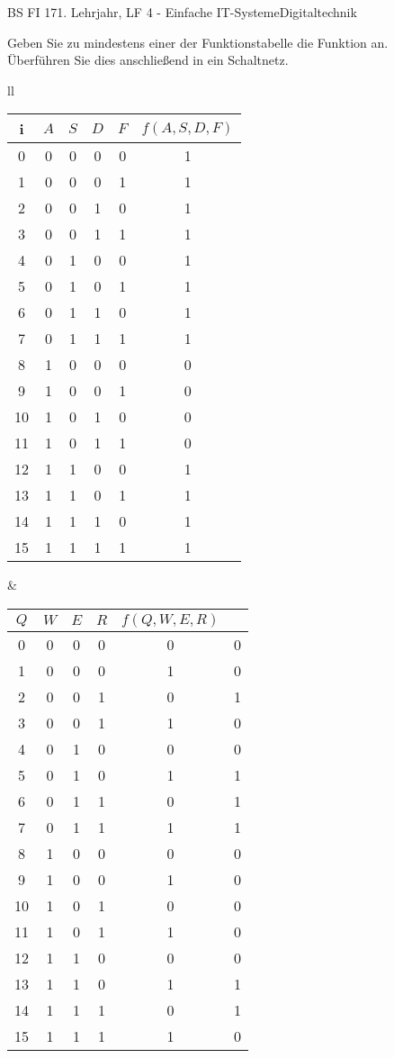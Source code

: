 \documentclass[oneside,openany,headings=optiontotoc,11pt,numbers=noenddot]{scrreprt}
\begin{document}
	\begin{worksheet}{BS FI 17}{1. Lehrjahr, LF 4 - Einfache IT-Systeme}{Digitaltechnik}
		\begin{framed}
			\noindent
			Geben Sie zu mindestens einer der Funktionstabelle die Funktion an.\\
			Überführen Sie dies anschließend in ein Schaltnetz.\\
			\par\noindent
			\begin{tabular}{ll}
				\begin{tabularx}{0.45\textwidth}{c|c|c|c|c|c}
					i & \(A\) & \(S\) & \(D\) & \(F\) & \(f(A, S, D, F)\)\\
					\hline
					0 & 0 & 0 & 0 & 0 & 1\\
					1 & 0 & 0 & 0 & 1 & 1\\
					2 & 0 & 0 & 1 & 0 & 1\\
					3 & 0 & 0 & 1 & 1 & 1\\
					4 & 0 & 1 & 0 & 0 & 1\\
					5 & 0 & 1 & 0 & 1 & 1\\
					6 & 0 & 1 & 1 & 0 & 1\\
					7 & 0 & 1 & 1 & 1 & 1\\
					8 & 1 & 0 & 0 & 0 & 0\\
					9 & 1 & 0 & 0 & 1 & 0\\
					10 & 1 & 0 & 1 & 0 & 0\\
					11 & 1 & 0 & 1 & 1 & 0\\
					12 & 1 & 1 & 0 & 0 & 1\\
					13 & 1 & 1 & 0 & 1 & 1\\
					14 & 1 & 1 & 1 & 0 & 1\\
					15 & 1 & 1 & 1 & 1 & 1
				\end{tabularx} &
				\begin{tabularx}{0.45\textwidth}{c|c|c|c|c|c}
					\(Q\) & \(W\) & \(E\) & \(R\) & \(f(Q, W, E, R)\)\\
					\hline
					0 & 0 & 0 & 0 & 0 & 0\\
					1 & 0 & 0 & 0 & 1 & 0\\
					2 & 0 & 0 & 1 & 0 & 1\\
					3 & 0 & 0 & 1 & 1 & 0\\
					4 & 0 & 1 & 0 & 0 & 0\\
					5 & 0 & 1 & 0 & 1 & 1\\
					6 & 0 & 1 & 1 & 0 & 1\\
					7 & 0 & 1 & 1 & 1 & 1\\
					8 & 1 & 0 & 0 & 0 & 0\\
					9 & 1 & 0 & 0 & 1 & 0\\
					10 & 1 & 0 & 1 & 0 & 0\\
					11 & 1 & 0 & 1 & 1 & 0\\
					12 & 1 & 1 & 0 & 0 & 0\\
					13 & 1 & 1 & 0 & 1 & 1\\
					14 & 1 & 1 & 1 & 0 & 1\\
					15 & 1 & 1 & 1 & 1 & 0
				\end{tabularx}
			\end{tabular}\\
		\end{framed}
	\end{worksheet}
\end{document}

